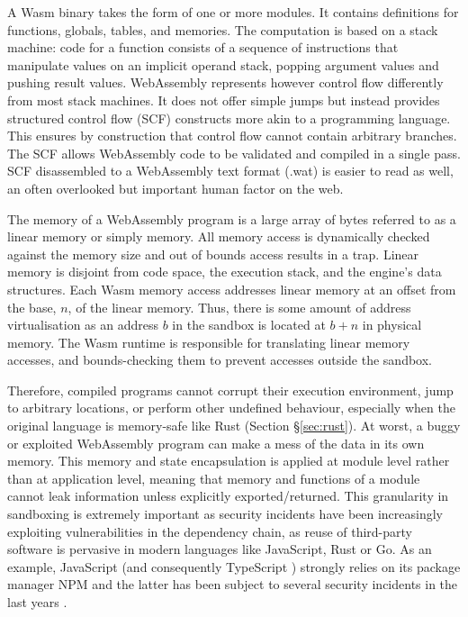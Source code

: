 A Wasm binary takes the form of one or more modules. It contains definitions for functions, globals, tables, and memories. The computation is based on a stack machine: code for a function consists of a sequence of instructions that manipulate values on an implicit operand stack, popping argument values and pushing result values. WebAssembly represents however control flow differently from most stack machines. It does not offer simple jumps but instead provides structured control flow (SCF) constructs more akin to a programming language. This ensures by construction that control flow cannot contain arbitrary branches. The SCF allows WebAssembly code to be validated and compiled in a single pass. SCF disassembled to a WebAssembly text format (.wat) is easier to read as well, an often overlooked but important human factor on the web.

The memory of a WebAssembly program is a large array of bytes referred to as a linear memory or simply memory. All memory access is dynamically checked against the memory size and out of bounds access results in a trap. Linear memory is disjoint from code space, the execution stack, and the engine's data structures. Each Wasm memory access addresses linear memory at an offset from the base, $n$, of the linear memory. Thus, there is some amount of address virtualisation as an address $b$ in the sandbox is located at $b + n$ in physical memory. The Wasm runtime is responsible for translating linear memory accesses, and bounds-checking them to prevent accesses outside the sandbox.

Therefore, compiled programs cannot corrupt their execution environment, jump to arbitrary locations, or perform other undefined behaviour, especially when the original language is memory-safe like Rust (Section §\ref{sec:rust}). At worst, a buggy or exploited WebAssembly program can make a mess of the data in its own memory. This memory and state encapsulation is applied at module level rather than at application level, meaning that memory and functions of a module cannot leak information unless explicitly exported/returned. This granularity in sandboxing is extremely important as security incidents have been increasingly exploiting vulnerabilities in the dependency chain, as reuse of third-party software is pervasive in modern languages like JavaScript, Rust or Go. As an example, JavaScript (and consequently TypeScript \cite{typescript}) strongly relies on its package manager NPM and the latter has been subject to several security incidents in the last years \cite{npm-security}.


